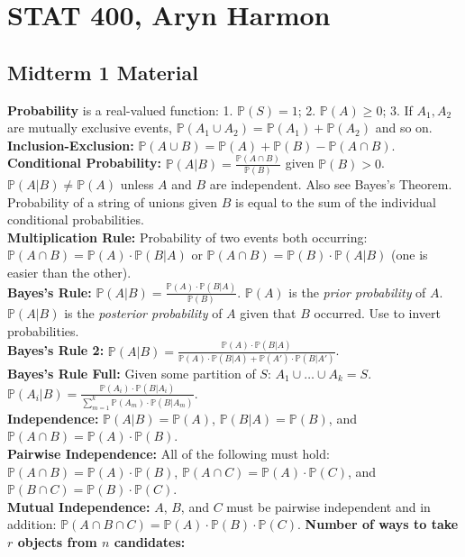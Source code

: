 \documentclass[10pt, twocolumn]{article}
\begin{document}
\section{STAT 400, Aryn Harmon}

\subsection{Midterm 1 Material}

\textbf{Probability} is a real-valued function:
1. $\mathbb{P}(S) = 1$; 2. $\mathbb{P}(A) \geq 0$; 3. If $A_1, A_2$ are mutually exclusive events, $\mathbb{P}(A_1 \cup A_2) = \mathbb{P}(A_1) + \mathbb{P}(A_2)$ and so on.\\
\textbf{Inclusion-Exclusion:} $\mathbb{P}(A \cup B) = \mathbb{P}(A) + \mathbb{P}(B) - \mathbb{P}(A \cap B)$.\\
\textbf{Conditional Probability:} $\mathbb{P}(A|B) = \frac{\mathbb{P}(A \cap B)}{\mathbb{P}(B)}$ given $\mathbb{P}(B) > 0$. $\mathbb{P}(A|B) \neq \mathbb{P}(A)$ unless $A$ and $B$ are independent. Also see Bayes's Theorem. Probability of a string of unions given $B$ is equal to the sum of the individual conditional probabilities.\\
\textbf{Multiplication Rule:} Probability of two events both occurring: $\mathbb{P}(A \cap B) = \mathbb{P}(A) \cdot \mathbb{P}(B|A)$ or $\mathbb{P}(A \cap B) = \mathbb{P}(B) \cdot \mathbb{P}(A|B)$ (one is easier than the other).\\
\textbf{Bayes's Rule:} $\mathbb{P}(A|B) = \frac{\mathbb{P}(A) \cdot \mathbb{P}(B|A)}{\mathbb{P}(B)}$. $\mathbb{P}(A)$ is the \textit{prior probability} of $A$. $\mathbb{P}(A|B)$ is the \textit{posterior probability} of $A$ given that $B$ occurred. Use to invert probabilities.\\
\textbf{Bayes's Rule 2:} $\mathbb{P}(A|B) = \frac{\mathbb{P}(A) \cdot \mathbb{P}(B|A)}{\mathbb{P}(A) \cdot \mathbb{P}(B|A) + \mathbb{P}(A') \cdot \mathbb{P}(B|A')}$.\\
\textbf{Bayes's Rule Full:} Given some partition of $S$: $A_1 \cup \dots \cup A_k = S$. $\mathbb{P}(A_i|B) = \frac{\mathbb{P}(A_i) \cdot \mathbb{P}(B|A_i)}{\sum_{m=1}^{k} \mathbb{P}(A_m) \cdot \mathbb{P}(B|A_m)}$.\\
\textbf{Independence:} $\mathbb{P}(A|B) = \mathbb{P}(A)$, $\mathbb{P}(B|A) = \mathbb{P}(B)$, and $\mathbb{P}(A \cap B) = \mathbb{P}(A) \cdot \mathbb{P}(B)$.\\
\textbf{Pairwise Independence:} All of the following must hold: $\mathbb{P}(A \cap B) = \mathbb{P}(A) \cdot \mathbb{P}(B)$, $\mathbb{P}(A \cap C) = \mathbb{P}(A) \cdot \mathbb{P}(C)$, and $\mathbb{P}(B \cap C) = \mathbb{P}(B) \cdot \mathbb{P}(C)$.\\
\textbf{Mutual Independence:} $A$, $B$, and $C$ must be pairwise independent and in addition: $\mathbb{P}(A \cap B \cap C) = \mathbb{P}(A) \cdot \mathbb{P}(B) \cdot \mathbb{P}(C)$.
\textbf{Number of ways to take $r$ objects from $n$ candidates:}
\end{document}

